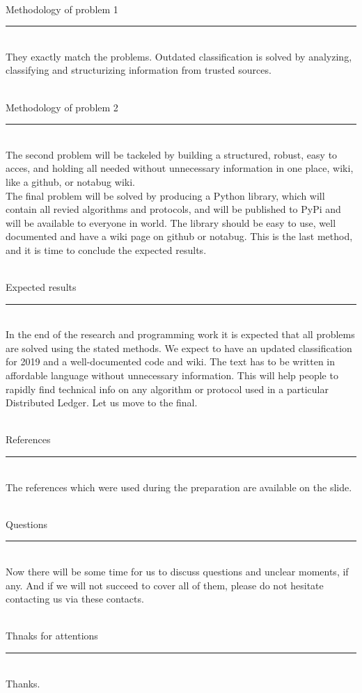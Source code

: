 \documentclass[12pt]{article}
\renewcommand{\line}[1]{\noindent\\{#1}\vspace{-0.42cm}\\\rule{\textwidth}{1pt}\\}
\begin{document}
\line{Methodology of problem 1}
They exactly match the problems. Outdated classification is solved by
analyzing, classifying and structurizing information from trusted sources.

\line{Methodology of problem 2}
The second problem will be tackeled by building a structured, robust, easy to
acces, and holding all needed without unnecessary information in one place,
wiki, like a github, or notabug wiki.\\
The final problem will be solved by producing a Python library, which will contain
all revied algorithms and protocols, and will be published to PyPi and will be
available to everyone in world. The library should be easy to use, well
documented and have a wiki page on github or notabug. This is the last method,
and it is time to conclude the expected results.

\line{Expected results}
In the end of the research and programming work it is expected that all
problems are solved using the stated methods. We expect to have an updated
classification for 2019 and a well-documented code and wiki. The text has to be
written in affordable language without unnecessary information. This will help
people to rapidly find technical info on any algorithm or protocol used in a
particular Distributed Ledger. Let us move to the final.

\line{References}
The references which were used during the preparation are available on the
slide.

\line{Questions}
Now there will be some time for us to discuss questions and unclear moments, if
any. And if we will not succeed to cover all of them, please do not hesitate
contacting us via these contacts.

\line{Thnaks for attentions}
Thanks.
\end{document}
